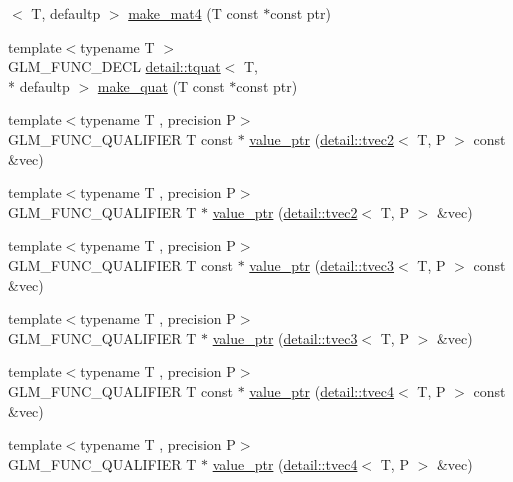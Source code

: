 \begin{DoxyCompactItemize}
$<$ T, defaultp $>$ \hyperlink{group__gtc__type__ptr_gac3920fd61f0c459a4749b8eb9107982c}{make\-\_\-mat4} (T const $\ast$const ptr)
\item 
{\footnotesize template$<$typename T $>$ }\\G\-L\-M\-\_\-\-F\-U\-N\-C\-\_\-\-D\-E\-C\-L \hyperlink{structglm_1_1detail_1_1tquat}{detail\-::tquat}$<$ T, \\*
defaultp $>$ \hyperlink{group__gtc__type__ptr_ga051ec24a44af31a08b11eccbf8726b02}{make\-\_\-quat} (T const $\ast$const ptr)
\item 
{\footnotesize template$<$typename T , precision P$>$ }\\G\-L\-M\-\_\-\-F\-U\-N\-C\-\_\-\-Q\-U\-A\-L\-I\-F\-I\-E\-R T const $\ast$ \hyperlink{group__gtc__type__ptr_gac57a976f59e794e6406ecf2924a18f4e}{value\-\_\-ptr} (\hyperlink{structglm_1_1detail_1_1tvec2}{detail\-::tvec2}$<$ T, P $>$ const \&vec)
\item 
{\footnotesize template$<$typename T , precision P$>$ }\\G\-L\-M\-\_\-\-F\-U\-N\-C\-\_\-\-Q\-U\-A\-L\-I\-F\-I\-E\-R T $\ast$ \hyperlink{group__gtc__type__ptr_gac2a64387090621acf7176b63f31b70a2}{value\-\_\-ptr} (\hyperlink{structglm_1_1detail_1_1tvec2}{detail\-::tvec2}$<$ T, P $>$ \&vec)
\item 
{\footnotesize template$<$typename T , precision P$>$ }\\G\-L\-M\-\_\-\-F\-U\-N\-C\-\_\-\-Q\-U\-A\-L\-I\-F\-I\-E\-R T const $\ast$ \hyperlink{group__gtc__type__ptr_ga676a0ba6f4b7cd817fe6d16cb3113857}{value\-\_\-ptr} (\hyperlink{structglm_1_1detail_1_1tvec3}{detail\-::tvec3}$<$ T, P $>$ const \&vec)
\item 
{\footnotesize template$<$typename T , precision P$>$ }\\G\-L\-M\-\_\-\-F\-U\-N\-C\-\_\-\-Q\-U\-A\-L\-I\-F\-I\-E\-R T $\ast$ \hyperlink{group__gtc__type__ptr_ga4babc9956e32bbd0769bc20ab2d73800}{value\-\_\-ptr} (\hyperlink{structglm_1_1detail_1_1tvec3}{detail\-::tvec3}$<$ T, P $>$ \&vec)
\item 
{\footnotesize template$<$typename T , precision P$>$ }\\G\-L\-M\-\_\-\-F\-U\-N\-C\-\_\-\-Q\-U\-A\-L\-I\-F\-I\-E\-R T const $\ast$ \hyperlink{group__gtc__type__ptr_ga6963deec2c77b8a49b3f7e434914f6ba}{value\-\_\-ptr} (\hyperlink{structglm_1_1detail_1_1tvec4}{detail\-::tvec4}$<$ T, P $>$ const \&vec)
\item 
{\footnotesize template$<$typename T , precision P$>$ }\\G\-L\-M\-\_\-\-F\-U\-N\-C\-\_\-\-Q\-U\-A\-L\-I\-F\-I\-E\-R T $\ast$ \hyperlink{group__gtc__type__ptr_gaa3ed69a05293987972b589311e5feb23}{value\-\_\-ptr} (\hyperlink{structglm_1_1detail_1_1tvec4}{detail\-::tvec4}$<$ T, P $>$ \&vec)

\end{DoxyCompactItemize}
